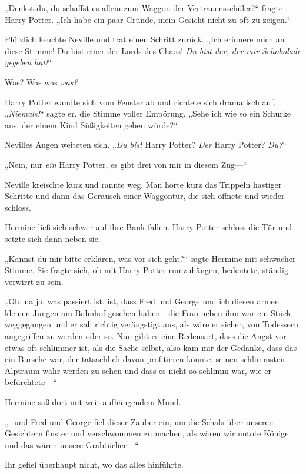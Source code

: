 {„Denkst du, du schaffst es allein zum Waggon der Vertrauensschüler?“ fragte Harry Potter. „Ich habe ein paar Gründe, mein Gesicht nicht zu oft zu zeigen.“

Plötzlich keuchte Neville und trat einen Schritt zurück. „Ich erinnere mich an diese Stimme! Du bist einer der Lords des Chaos! \emph{Du bist der, der mir Schokolade gegeben hat!}“

Was? Was was \emph{was?}

Harry Potter wandte sich vom Fenster ab und richtete sich dramatisch auf. „\emph{Niemals!}“ sagte er, die Stimme voller Empörung. „Sehe ich wie so ein Schurke aus, der einem Kind Süßigkeiten geben würde?“

Nevilles Augen weiteten sich. „\emph{Du bist} Harry Potter? \emph{Der} Harry Potter? \emph{Du?}“

„Nein, nur \emph{ein} Harry Potter, es gibt drei von mir in diesem Zug—“

Neville kreischte kurz und rannte weg. Man hörte kurz das Trippeln hastiger Schritte und dann das Geräusch einer Waggontür, die sich öffnete und wieder schloss.

Hermine ließ sich schwer auf ihre Bank fallen. Harry Potter schloss die Tür und setzte sich dann neben sie.

„Kannst du mir bitte erklären, was vor sich geht?“ sagte Hermine mit schwacher Stimme. Sie fragte sich, ob mit Harry Potter rumzuhängen, bedeutete, ständig verwirrt zu sein.

„Oh, na ja, was passiert ist, ist, dass Fred und George und ich diesen armen kleinen Jungen am Bahnhof gesehen haben—die Frau neben ihm war ein Stück weggegangen und er sah richtig verängstigt aus, als wäre er sicher, von Todessern angegriffen zu werden oder so. Nun gibt es eine Redensart, dass die Angst vor etwas oft schlimmer ist, als die Sache selbst, also kam mir der Gedanke, dass das ein Bursche war, der tatsächlich davon profitieren könnte, seinen schlimmsten Alptraum wahr werden zu sehen und dass es nicht so schlimm war, wie er befürchtete—“

Hermine saß dort mit weit aufhängendem Mund.

„- und Fred und George fiel dieser Zauber ein, um die Schals über unseren Gesichtern finster und verschwommen zu machen, als wären wir untote Könige und das wären unsere Grabtücher—“

Ihr gefiel überhaupt nicht, wo das alles hinführte.

}
